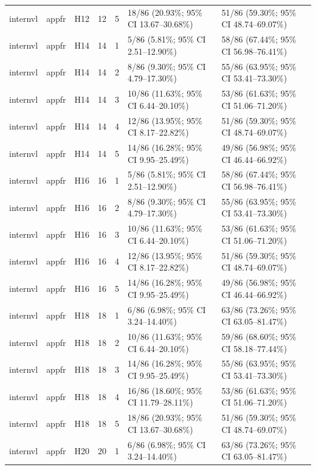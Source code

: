 \begin{longtable}{lllrrll}
internvl & appfr & H12 & 12 & 5 & 18/86 (20.93\%; 95\% CI 13.67–30.68\%) & 51/86 (59.30\%; 95\% CI 48.74–69.07\%) \\
internvl & appfr & H14 & 14 & 1 & 5/86 (5.81\%; 95\% CI 2.51–12.90\%) & 58/86 (67.44\%; 95\% CI 56.98–76.41\%) \\
internvl & appfr & H14 & 14 & 2 & 8/86 (9.30\%; 95\% CI 4.79–17.30\%) & 55/86 (63.95\%; 95\% CI 53.41–73.30\%) \\
internvl & appfr & H14 & 14 & 3 & 10/86 (11.63\%; 95\% CI 6.44–20.10\%) & 53/86 (61.63\%; 95\% CI 51.06–71.20\%) \\
internvl & appfr & H14 & 14 & 4 & 12/86 (13.95\%; 95\% CI 8.17–22.82\%) & 51/86 (59.30\%; 95\% CI 48.74–69.07\%) \\
internvl & appfr & H14 & 14 & 5 & 14/86 (16.28\%; 95\% CI 9.95–25.49\%) & 49/86 (56.98\%; 95\% CI 46.44–66.92\%) \\
internvl & appfr & H16 & 16 & 1 & 5/86 (5.81\%; 95\% CI 2.51–12.90\%) & 58/86 (67.44\%; 95\% CI 56.98–76.41\%) \\
internvl & appfr & H16 & 16 & 2 & 8/86 (9.30\%; 95\% CI 4.79–17.30\%) & 55/86 (63.95\%; 95\% CI 53.41–73.30\%) \\
internvl & appfr & H16 & 16 & 3 & 10/86 (11.63\%; 95\% CI 6.44–20.10\%) & 53/86 (61.63\%; 95\% CI 51.06–71.20\%) \\
internvl & appfr & H16 & 16 & 4 & 12/86 (13.95\%; 95\% CI 8.17–22.82\%) & 51/86 (59.30\%; 95\% CI 48.74–69.07\%) \\
internvl & appfr & H16 & 16 & 5 & 14/86 (16.28\%; 95\% CI 9.95–25.49\%) & 49/86 (56.98\%; 95\% CI 46.44–66.92\%) \\
internvl & appfr & H18 & 18 & 1 & 6/86 (6.98\%; 95\% CI 3.24–14.40\%) & 63/86 (73.26\%; 95\% CI 63.05–81.47\%) \\
internvl & appfr & H18 & 18 & 2 & 10/86 (11.63\%; 95\% CI 6.44–20.10\%) & 59/86 (68.60\%; 95\% CI 58.18–77.44\%) \\
internvl & appfr & H18 & 18 & 3 & 14/86 (16.28\%; 95\% CI 9.95–25.49\%) & 55/86 (63.95\%; 95\% CI 53.41–73.30\%) \\
internvl & appfr & H18 & 18 & 4 & 16/86 (18.60\%; 95\% CI 11.79–28.11\%) & 53/86 (61.63\%; 95\% CI 51.06–71.20\%) \\
internvl & appfr & H18 & 18 & 5 & 18/86 (20.93\%; 95\% CI 13.67–30.68\%) & 51/86 (59.30\%; 95\% CI 48.74–69.07\%) \\
internvl & appfr & H20 & 20 & 1 & 6/86 (6.98\%; 95\% CI 3.24–14.40\%) & 63/86 (73.26\%; 95\% CI 63.05–81.47\%) \\

\end{longtable}
